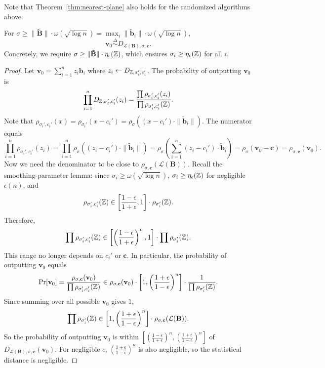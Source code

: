 Note that Theorem~\ref{thm:nearest-plane} also holds for the randomized algorithms above.

\begin{theorem}
	\label{thm:gpv-density}
	For $\sigma \geq \|\mathbf{\tilde B}\| \cdot \omega(\sqrt{\log n}) = \max_i \|\mathbf{\tilde b}_i\| \cdot \omega(\sqrt{\log n})$,
	\[
		\mathbf{v}_0 \stackrel{\Delta}{\sim} D_{\mathcal{L}(\mathbf{B}), \sigma, \mathbf{c}}.
	\]
	Concretely, we require $\sigma \geq \|\mathbf{\tilde B}\| \cdot \eta_\epsilon(\mathbb{Z})$, which ensures $\sigma_i \geq \eta_\epsilon(\mathbb{Z})$ for all $i$.
\end{theorem}

\begin{proof}
	Let $\mathbf{v}_0 = \sum_{i=1}^n z_i \mathbf{b}_i$ where $z_i \gets D_{\mathbb{Z}, \sigma_i', c_i'}$. The probability of outputting $\mathbf{v}_0$ is
	\[
		\prod_{i=1}^n D_{\mathbb{Z}, \sigma_i', c_i'}(z_i) = \frac{\prod \rho_{\sigma_i', c_i'}(z_i)}{\prod \rho_{\sigma_i', c_i'}(\mathbb{Z})}.
	\]
	Note that $\rho_{\sigma_i', c_i'}(x) = \rho_{\sigma_i'}(x - c_i') = \rho_\sigma((x-c_i') \cdot \|\mathbf{\tilde b}_i\|)$. The numerator equals
	\[
		\prod_{i=1}^n \rho_{\sigma_i', c_i'}(z_i) = \prod_{i=1}^n \rho_\sigma((z_i - c_i') \cdot \|\mathbf{\tilde b}_i\|) = \rho_\sigma\left( \sum_{i=1}^n (z_i - c_i') \cdot \mathbf{\tilde b}_i \right) = \rho_\sigma(\mathbf{v}_0 - \mathbf{c}) = \rho_{\sigma, \mathbf{c}}(\mathbf{v}_0).
	\]
	Now we need the denominator to be close to $\rho_{\sigma, \mathbf{c}}(\mathcal{L}(\mathbf{B}))$. Recall the smoothing-parameter lemma: since $\sigma_i \geq \omega(\sqrt{\log n})$, $\sigma_i \geq \eta_\epsilon(\mathbb{Z})$ for negligible $\epsilon(n)$, and
	\[
		\rho_{\sigma_i', c_i'}(\mathbb{Z}) \in \left[ \frac{1-\epsilon}{1+\epsilon}, 1 \right] \cdot \rho_{\sigma_i'}(\mathbb{Z}).
	\]
	Therefore,
	\[
		\prod \rho_{\sigma_i', c_i'}(\mathbb{Z}) \in \left[ \left(\frac{1-\epsilon}{1+\epsilon}\right)^n, 1 \right] \cdot \prod \rho_{\sigma_i'}(\mathbb{Z}).
	\]
	This range no longer depends on $c_i'$ or $\mathbf{c}$. In particular, the probability of outputting $\mathbf{v}_0$ equals
	\[
		\Pr[\mathbf{v}_0] = \frac{\rho_{\sigma, \mathbf{c}}(\mathbf{v}_0)}{\prod \rho_{\sigma_i', c_i'}(\mathbb{Z})} \in \rho_{\sigma, \mathbf{c}}(\mathbf{v}_0) \cdot \left[ 1, \left(\frac{1+\epsilon}{1-\epsilon}\right)^n \right] \cdot \frac{1}{\prod \rho_{\sigma_i'}(\mathbb{Z})}.
	\]
	Since summing over all possible $\mathbf{v}_0$ gives $1$,
	\[
		\prod \rho_{\sigma_i'}(\mathbb{Z}) \in \left[ 1, \left(\frac{1+\epsilon}{1-\epsilon}\right)^n \right] \cdot \rho_{\sigma, \mathbf{c}}(\mathcal{L}(\mathbf{B})).
	\]
	So the probability of outputting $\mathbf{v}_0$ is within $\left[ \left(\frac{1-\epsilon}{1+\epsilon}\right)^n, \left(\frac{1+\epsilon}{1-\epsilon}\right)^n \right]$ of $D_{\mathcal{L}(\mathbf{B}), \sigma, \mathbf{c}}(\mathbf{v}_0)$. For negligible $\epsilon$, $\left(\frac{1+\epsilon}{1-\epsilon}\right)^n$ is also negligible, so the statistical distance is negligible.


\end{proof}
